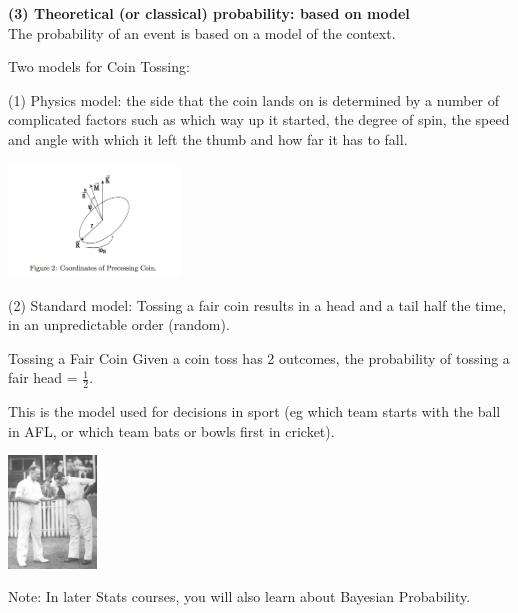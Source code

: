 \documentclass[t,xcolor=pdftex,dvipsnames,table]{beamer}\usepackage[]{graphicx}\usepackage[]{color}
\begin{document}
\begin{frame}{}

{\bf (3) Theoretical (or classical) probability: based on model} \\
The probability of an event is based on a model of the context. 

\vspace{.5cm}
Two models for Coin Tossing: 

\vspace{.5cm}
(1) Physics model: the side that the coin lands on is determined by a number of complicated factors such as which way up it started, the degree of spin, the speed and angle with which it left the thumb and how far it has to fall.
\href{https://www.youtube.com/watch?v=AYnJv68T3MM}{} 
\href{https://www.youtube.com/watch?v=Obg7JPd6cmw}{}

\begin{center}
\includegraphics[height=3cm]{../images/CoinPhysics.jpg}
\end{center}

\end{frame}

\begin{frame}{}

(2) Standard model: Tossing a fair coin results in a head and a tail half the time, in an unpredictable order (random). 

\vspace{.5cm}
\begin{block}{Tossing a Fair Coin}
Given a coin toss has 2 outcomes, the probability of tossing a fair head =  $\frac{1}{2}$.
\end{block}

\vspace{.5cm}
This is the model used for decisions in sport (eg which team starts with the ball in AFL, or which team bats or bowls first in cricket).

\begin{center}
\includegraphics[height=3cm]{../images/BradmanAllenToss.jpg}
\end{center}

\vspace{.5cm}
{\tiny Note: In later Stats courses, you will also learn about Bayesian Probability.}

\end{frame}
\end{document}
